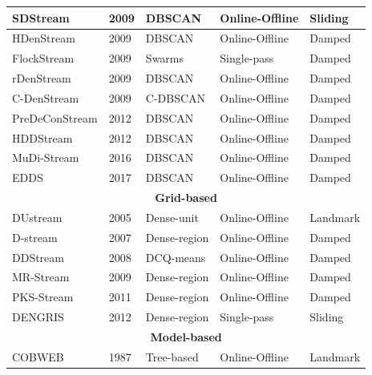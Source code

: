 \begin{table}[!ht]
\begin{tabular}{lllll}
SDStream            & 2009          & DBSCAN            & Online-Offline      & Sliding              \\ \hline
HDenStream          & 2009          & DBSCAN            & Online-Offline      & Damped               \\ \hline
FlockStream         & 2009          & Swarms            & Single-pass         & Damped               \\ \hline
rDenStream          & 2009          & DBSCAN            & Online-Offline      & Damped               \\ \hline
C-DenStream         & 2009          & C-DBSCAN          & Online-Offline      & Damped               \\ \hline
PreDeConStream      & 2012          & DBSCAN            & Online-Offline      & Damped               \\ \hline
HDDStream           & 2012          & DBSCAN            & Online-Offline      & Damped               \\ \hline
MuDi-Stream         & 2016          & DBSCAN            & Online-Offline      & Damped               \\ \hline
EDDS                & 2017          & DBSCAN            & Online-Offline      & Damped               \\ \hline
\multicolumn{5}{c}{\cellcolor[HTML]{C0C0C0}\textbf{Grid-based}}                                      \\ \hline
DUstream            & 2005          & Dense-unit        & Online-Offline      & Landmark             \\ \hline
D-stream            & 2007          & Dense-region      & Online-Offline      & Damped               \\ \hline
DDStream            & 2008          & DCQ-means         & Online-Offline      & Damped               \\ \hline
MR-Stream           & 2009          & Dense-region      & Online-Offline      & Damped               \\ \hline
PKS-Stream          & 2011          & Dense-region      & Online-Offline      & Damped               \\ \hline
DENGRIS             & 2012          & Dense-region      & Single-pass         & Sliding              \\ \hline
\multicolumn{5}{c}{\cellcolor[HTML]{C0C0C0}\textbf{Model-based}}                                     \\ \hline
COBWEB              & 1987          & Tree-based        & Online-Offline      & Landmark             \\ \hline

\end{tabular}
\end{table}
